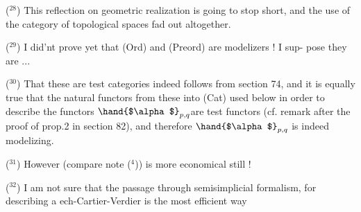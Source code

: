 ($^{28}$) This reflection on geometric realization is going to stop short,
and the use of the category of topological spaces  fad out altogether.

($^{29}$) I did'nt prove yet that (Ord) and (Preord) are modelizers !  I sup-%
pose they are ...

($^{30}$) That these are test categories indeed follows from section 74,
and it is equally true that the natural functors from these into (Cat)\hand{\unsure{,}}
\hand{(}used below in order to describe the functors $\hand{$\alpha$}_{p,q}$\hand{)}are test functors
(cf. remark after the proof of prop.2 in section 82),  and therefore
$\hand{$\alpha$}_{p,q}$ is indeed modelizing.

($^{31}$) However \hand{\unsure{$\emptyset$}}(compare note ($^4$)) is more economical still !

($^{32}$) I am not sure that the passage through semisimplicial formalism,
for describing a ech-Cartier-Verdier \hand{,} is the most efficient way\hand{,}


